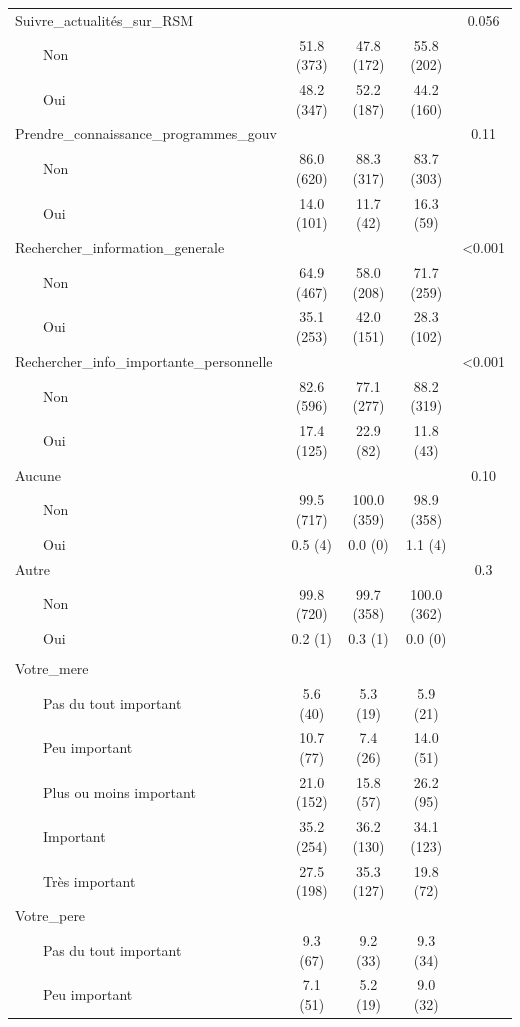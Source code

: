 \documentclass[
]{article}
\begin{document}
\begin{table}[!t]
\begin{tabular*}{\linewidth}{@{\extracolsep{\fill}}lcccc}
Suivre\_actualités\_sur\_RSM &  &  &  & 0.056 \\ 
    Non & 51.8 (373) & 47.8 (172) & 55.8 (202) &  \\ 
    Oui & 48.2 (347) & 52.2 (187) & 44.2 (160) &  \\ 
Prendre\_connaissance\_programmes\_gouv &  &  &  & 0.11 \\ 
    Non & 86.0 (620) & 88.3 (317) & 83.7 (303) &  \\ 
    Oui & 14.0 (101) & 11.7 (42) & 16.3 (59) &  \\ 
Rechercher\_information\_generale &  &  &  & <0.001 \\ 
    Non & 64.9 (467) & 58.0 (208) & 71.7 (259) &  \\ 
    Oui & 35.1 (253) & 42.0 (151) & 28.3 (102) &  \\ 
Rechercher\_info\_importante\_personnelle &  &  &  & <0.001 \\ 
    Non & 82.6 (596) & 77.1 (277) & 88.2 (319) &  \\ 
    Oui & 17.4 (125) & 22.9 (82) & 11.8 (43) &  \\ 
Aucune &  &  &  & 0.10 \\ 
    Non & 99.5 (717) & 100.0 (359) & 98.9 (358) &  \\ 
    Oui & 0.5 (4) & 0.0 (0) & 1.1 (4) &  \\ 
Autre &  &  &  & 0.3 \\ 
    Non & 99.8 (720) & 99.7 (358) & 100.0 (362) &  \\ 
    Oui & 0.2 (1) & 0.3 (1) & 0.0 (0) &  \\ 
\midrule\addlinespace[2.5pt]
\multicolumn{5}{l}{Quête\_informatins} \\[2.5pt] 
\midrule\addlinespace[2.5pt]
Votre\_mere &  &  &  &  \\ 
    Pas du tout important & 5.6 (40) & 5.3 (19) & 5.9 (21) &  \\ 
    Peu important & 10.7 (77) & 7.4 (26) & 14.0 (51) &  \\ 
    Plus ou moins important & 21.0 (152) & 15.8 (57) & 26.2 (95) &  \\ 
    Important & 35.2 (254) & 36.2 (130) & 34.1 (123) &  \\ 
    Très important & 27.5 (198) & 35.3 (127) & 19.8 (72) &  \\ 
Votre\_pere &  &  &  &  \\ 
    Pas du tout important & 9.3 (67) & 9.2 (33) & 9.3 (34) &  \\ 
    Peu important & 7.1 (51) & 5.2 (19) & 9.0 (32) &  \\ 

\end{tabular*}
\end{table}
\end{document}
